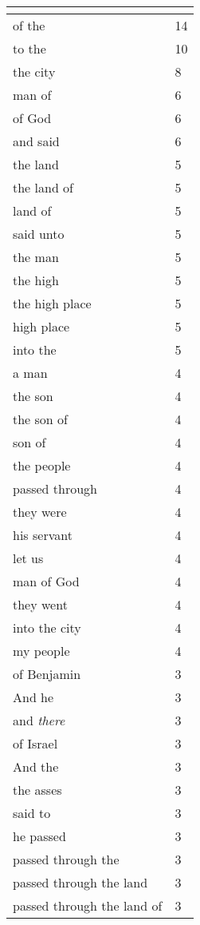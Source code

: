 \begin{center}
\begin{longtable}{|p{3.0in}|p{0.5in}|}
\hline \multicolumn{2}{c}{{ }} \\ \hline
\endfoot 
of the & 14\\ \hline 
to the & 10\\ \hline 
the city & 8\\ \hline 
man of & 6\\ \hline 
of God & 6\\ \hline 
and said & 6\\ \hline 
the land & 5\\ \hline 
the land of & 5\\ \hline 
land of & 5\\ \hline 
said unto & 5\\ \hline 
the man & 5\\ \hline 
the high & 5\\ \hline 
the high place & 5\\ \hline 
high place & 5\\ \hline 
into the & 5\\ \hline 
a man & 4\\ \hline 
the son & 4\\ \hline 
the son of & 4\\ \hline 
son of & 4\\ \hline 
the people & 4\\ \hline 
passed through & 4\\ \hline 
they were & 4\\ \hline 
his servant & 4\\ \hline 
let us & 4\\ \hline 
man of God & 4\\ \hline 
they went & 4\\ \hline 
into the city & 4\\ \hline 
my people & 4\\ \hline 
of Benjamin & 3\\ \hline 
And he & 3\\ \hline 
and \emph{there} & 3\\ \hline 
of Israel & 3\\ \hline 
And the & 3\\ \hline 
the asses & 3\\ \hline 
said to & 3\\ \hline 
he passed & 3\\ \hline 
passed through the & 3\\ \hline 
passed through the land & 3\\ \hline 
passed through the land of & 3\\ \hline 

\end{longtable}
\end{center}
